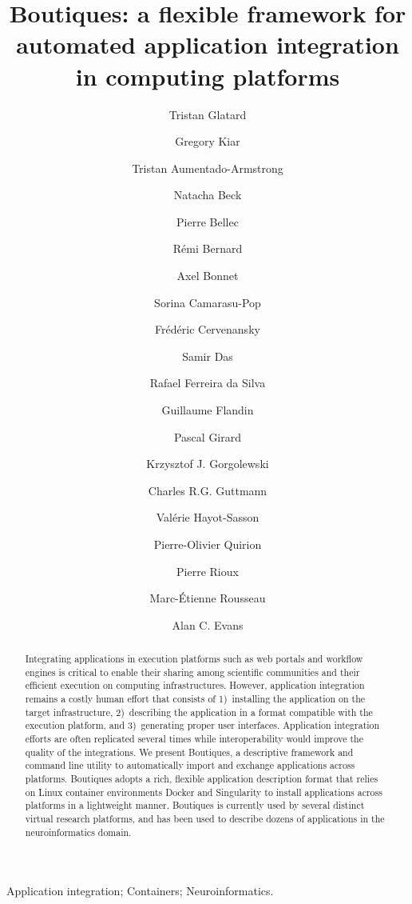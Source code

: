 \documentclass[a4paper,num-refs]{oup-contemporary}
\title{Boutiques: a flexible framework for automated application integration in computing platforms}
\newcommand{\boutiques}{Boutiques\xspace}
\begin{document}
\author[1]{Tristan Glatard}
\author[2,3]{Gregory Kiar}
\author[2,3]{Tristan Aumentado-Armstrong}
\author[2,3]{Natacha Beck}
\author[4]{Pierre Bellec}
\author[2,3]{R\'emi Bernard}
\author[5]{Axel Bonnet}
\author[5]{Sorina Camarasu-Pop}
\author[5]{Fr\'ed\'eric Cervenansky}
\author[2,3]{Samir Das}
\author[6]{Rafael Ferreira da Silva}
\author[7]{Guillaume Flandin}
\author[5]{Pascal Girard}
\author[8]{Krzysztof J. Gorgolewski}
\author[9]{Charles R.G. Guttmann}
\author[1]{Val\'erie Hayot-Sasson}
\author[4]{Pierre-Olivier Quirion}
\author[2,3]{Pierre Rioux}
\author[10]{Marc-\'Etienne Rousseau}
\author[2,3]{Alan C. Evans}


\begin{frontmatter}
\maketitle

\begin{abstract}Integrating applications in execution platforms such as web
  portals and workflow engines is critical to enable their sharing
  among scientific communities and their efficient execution on
  computing infrastructures. However, application integration remains
  a costly human effort that consists of 1)~installing the application
  on the target infrastructure, 2)~describing the application in a
  format compatible with the execution platform, and 3)~generating
  proper user interfaces. Application integration efforts are often
  replicated several times while interoperability would improve the
  quality of the integrations. We present \boutiques, a descriptive
  framework and command line utility to automatically import and
  exchange applications across platforms. \boutiques adopts a rich,
  flexible application description format that relies on Linux
  container environments Docker and Singularity to install
  applications across platforms in a lightweight manner. \boutiques is
  currently used by several distinct virtual research platforms, and
  has been used to describe dozens of applications in the
  neuroinformatics domain.
\end{abstract}

\begin{keywords}
Application integration; Containers; Neuroinformatics.
\end{keywords}
\end{frontmatter}
\end{document}
